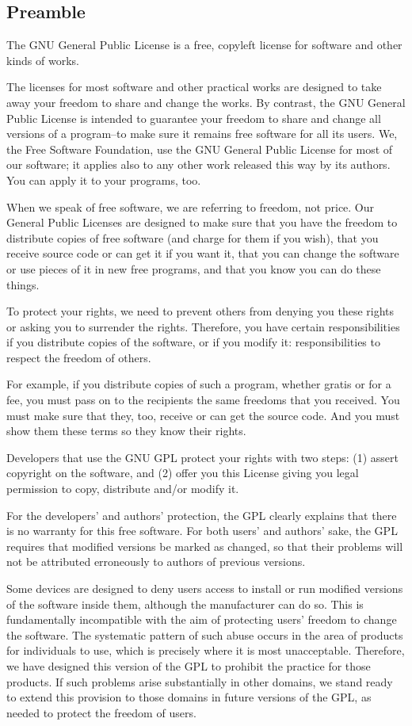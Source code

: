 \documentclass{article}
\begin{document}
\subsection{Preamble}
The GNU General Public License is a free, copyleft license for software and other kinds of works.

The licenses for most software and other practical works are designed to take away your freedom to share and change the works.  By contrast, the GNU General Public License is intended to guarantee your freedom to share and change all versions of a program--to make sure it remains free software for all its users.  We, the Free Software Foundation, use the GNU General Public License for most of our software; it applies also to any other work released this way by its authors.  You can apply it to your programs, too.

When we speak of free software, we are referring to freedom, not price.  Our General Public Licenses are designed to make sure that you have the freedom to distribute copies of free software (and charge for them if you wish), that you receive source code or can get it if you want it, that you can change the software or use pieces of it in new free programs, and that you know you can do these things.

To protect your rights, we need to prevent others from denying you these rights or asking you to surrender the rights.  Therefore, you have certain responsibilities if you distribute copies of the software, or if you modify it: responsibilities to respect the freedom of others.

For example, if you distribute copies of such a program, whether gratis or for a fee, you must pass on to the recipients the same freedoms that you received.  You must make sure that they, too, receive or can get the source code.  And you must show them these terms so they know their rights.

Developers that use the GNU GPL protect your rights with two steps: (1) assert copyright on the software, and (2) offer you this License giving you legal permission to copy, distribute and/or modify it.

For the developers' and authors' protection, the GPL clearly explains that there is no warranty for this free software.  For both users' and authors' sake, the GPL requires that modified versions be marked as changed, so that their problems will not be attributed erroneously to authors of previous versions.

Some devices are designed to deny users access to install or run modified versions of the software inside them, although the manufacturer can do so.  This is fundamentally incompatible with the aim of protecting users' freedom to change the software.  The systematic pattern of such abuse occurs in the area of products for individuals to use, which is precisely where it is most unacceptable.  Therefore, we have designed this version of the GPL to prohibit the practice for those products.  If such problems arise substantially in other domains, we stand ready to extend this provision to those domains in future versions of the GPL, as needed to protect the freedom of users.
\end{document}
